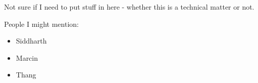 
\begin{acknowledgements}      


Not sure if I need to put stuff in here - whether this is a technical matter or not.

People I might mention:
\begin{itemize}
	\item Siddharth
	\item Marcin
	\item Thang
\end{itemize}


\end{acknowledgements}
